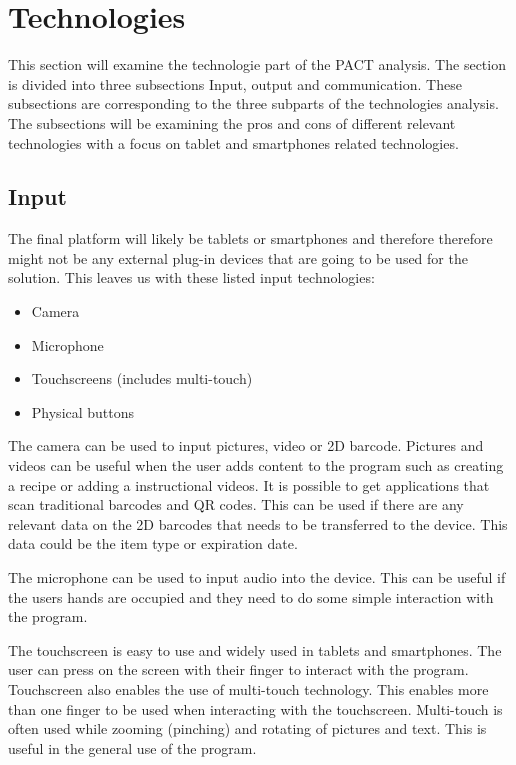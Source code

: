 \section{Technologies}
This section will examine the technologie part of the PACT analysis. The section is divided into three subsections Input, output and communication. These subsections are corresponding to the three subparts of the technologies analysis. The subsections will be examining the pros and cons of different relevant technologies with a focus on tablet and smartphones related technologies.

\subsection{Input}
The final platform will likely be tablets or smartphones and therefore therefore might not be any external plug-in devices that are going to be used for the solution. This leaves us with these listed input technologies:

\begin{itemize}
    \item Camera
    \item Microphone
    \item Touchscreens (includes multi-touch)
    \item Physical buttons
\end{itemize}

The camera can be used to input pictures, video or 2D barcode. Pictures and videos can be useful when the user adds content to the program such as creating a recipe or adding a instructional videos. It is possible to get applications that scan traditional barcodes and QR codes. This can be used if there are any relevant data on the 2D barcodes that needs to be transferred to the device. This data could be the item type or expiration date.           
    
The microphone can be used to input audio into the device. This can be useful if the users hands are occupied and they need to do some simple interaction with the program.  


The touchscreen is easy to use and widely used in tablets and smartphones. The user can press on the screen with their finger to interact with the program. Touchscreen also enables the use of multi-touch technology. This enables more than one finger to be used when interacting with the touchscreen. Multi-touch is often used while zooming (pinching) and rotating of pictures and text. This is useful in the general use of the program.

